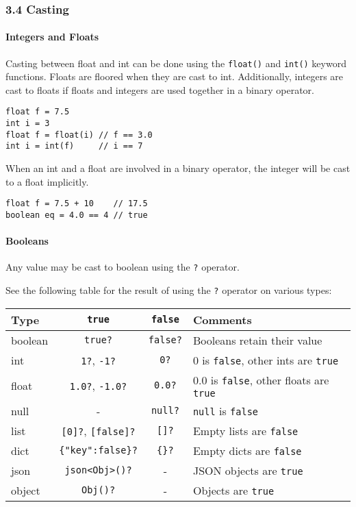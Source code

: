 \subsubsection{3.4 Casting}\label{casting}

\paragraph{Integers and Floats}\label{integers-and-floats}

Casting between float and int can be done using the \texttt{float()} and
\texttt{int()} keyword functions. Floats are floored when they are cast
to int. Additionally, integers are cast to floats if floats and integers
are used together in a binary operator.

\begin{verbatim}
float f = 7.5
int i = 3
float f = float(i) // f == 3.0
int i = int(f)     // i == 7
\end{verbatim}

When an int and a float are involved in a binary operator, the integer
will be cast to a float implicitly.

\begin{verbatim}
float f = 7.5 + 10    // 17.5
boolean eq = 4.0 == 4 // true
\end{verbatim}

\paragraph{Booleans}\label{booleans-1}

Any value may be cast to boolean using the \texttt{?} operator.

See the following table for the result of using the \texttt{?} operator
on various types:

\begin{longtable}[c]{@{}lccl@{}}
\toprule
Type & \texttt{true} & \texttt{false} & Comments\tabularnewline
\midrule
\endhead
boolean & \texttt{true?} & \texttt{false?} & Booleans retain their
value\tabularnewline
int & \texttt{1?}, \texttt{-1?} & \texttt{0?} & 0 is \texttt{false},
other ints are \texttt{true}\tabularnewline
float & \texttt{1.0?}, \texttt{-1.0?} & \texttt{0.0?} & 0.0 is
\texttt{false}, other floats are \texttt{true}\tabularnewline
null & - & \texttt{null?} & \texttt{null} is
\texttt{false}\tabularnewline
list & \texttt{{[}0{]}?}, \texttt{{[}false{]}?} & \texttt{{[}{]}?} &
Empty lists are \texttt{false}\tabularnewline
dict & \texttt{\{"key":false\}?} & \texttt{\{\}?} & Empty dicts are
\texttt{false}\tabularnewline
json & \texttt{json\textless{}Obj\textgreater{}()?} & - & JSON objects
are \texttt{true}\tabularnewline
object & \texttt{Obj()?} & - & Objects are \texttt{true}\tabularnewline
\bottomrule
\end{longtable}

